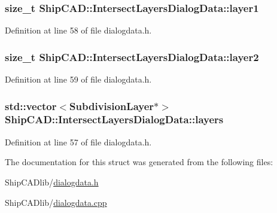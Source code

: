 \subsubsection[{\texorpdfstring{layer1}{layer1}}]{\setlength{\rightskip}{0pt plus 5cm}size\+\_\+t Ship\+C\+A\+D\+::\+Intersect\+Layers\+Dialog\+Data\+::layer1}\hypertarget{structShipCAD_1_1IntersectLayersDialogData_a2a06240ead3bc2d61dbc5bb3eb21ea99}{}\label{structShipCAD_1_1IntersectLayersDialogData_a2a06240ead3bc2d61dbc5bb3eb21ea99}


Definition at line 58 of file dialogdata.\+h.

\subsubsection[{\texorpdfstring{layer2}{layer2}}]{\setlength{\rightskip}{0pt plus 5cm}size\+\_\+t Ship\+C\+A\+D\+::\+Intersect\+Layers\+Dialog\+Data\+::layer2}\hypertarget{structShipCAD_1_1IntersectLayersDialogData_ad138f2eea90f7bac0a9c331375b1704a}{}\label{structShipCAD_1_1IntersectLayersDialogData_ad138f2eea90f7bac0a9c331375b1704a}


Definition at line 59 of file dialogdata.\+h.

\subsubsection[{\texorpdfstring{layers}{layers}}]{\setlength{\rightskip}{0pt plus 5cm}std\+::vector$<${\bf Subdivision\+Layer}$\ast$$>$ Ship\+C\+A\+D\+::\+Intersect\+Layers\+Dialog\+Data\+::layers}\hypertarget{structShipCAD_1_1IntersectLayersDialogData_a4eaea862a9ce61c04b6a1d0b972ca9c1}{}\label{structShipCAD_1_1IntersectLayersDialogData_a4eaea862a9ce61c04b6a1d0b972ca9c1}


Definition at line 57 of file dialogdata.\+h.



The documentation for this struct was generated from the following files\+:\begin{DoxyCompactItemize}
\item 
Ship\+C\+A\+Dlib/\hyperlink{dialogdata_8h}{dialogdata.\+h}\item 
Ship\+C\+A\+Dlib/\hyperlink{dialogdata_8cpp}{dialogdata.\+cpp}\end{DoxyCompactItemize}
